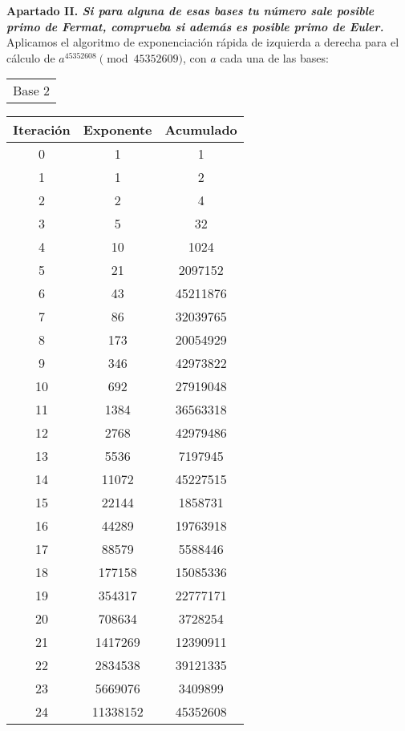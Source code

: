 \documentclass[fleqn]{article}
\begin{document}
    \newpage
    \textbf{Apartado II. \textit{Si para alguna de esas bases tu número sale posible primo de Fermat, comprueba si además es posible primo de Euler.}}
    Aplicamos el algoritmo de exponenciación rápida de izquierda a derecha para el cálculo de $ a^{45352608} \pmod45352609$, con $a$ cada una de las bases:


    \begin{center}
        \begin{tabular}{c}
            Base 2 \\
        \end{tabular}
        \begin{tabular}{c | c | c}
            Iteración & Exponente & Acumulado \\ \hline
            0 & 1 & 1 \\
            1 & 1 & 2 \\
            2 & 2 & 4 \\
            3 & 5 & 32 \\
            4 & 10 & 1024 \\
            5 & 21 & 2097152 \\
            6 & 43 & 45211876 \\
            7 & 86 & 32039765 \\
            8 & 173 & 20054929 \\
            9 & 346 & 42973822 \\
            10 & 692 & 27919048 \\
            11 & 1384 & 36563318 \\
            12 & 2768 & 42979486 \\
            13 & 5536 & 7197945 \\
            14 & 11072 & 45227515 \\
            15 & 22144 & 1858731 \\
            16 & 44289 & 19763918 \\
            17 & 88579 & 5588446 \\
            18 & 177158 & 15085336 \\
            19 & 354317 & 22777171 \\
            20 & 708634 & 3728254 \\
            21 & 1417269 & 12390911 \\
            22 & 2834538 & 39121335 \\
            23 & 5669076 & 3409899 \\
            24 & 11338152 & 45352608 \\

\end{tabular}
\end{center}
\end{document}
